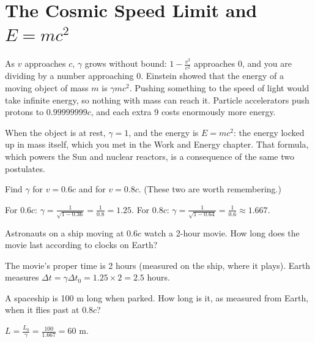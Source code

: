 \section{The Cosmic Speed Limit and $E = mc^2$}
As $v$ approaches $c$, $\gamma$ grows without bound: $1 - \frac{v^2}{c^2}$ approaches 0, and you are
dividing by a number approaching 0. Einstein showed that the energy of a moving object of mass $m$
is $\gamma mc^2$. Pushing something to the speed of light would take infinite energy, so nothing
with mass can reach it. Particle accelerators push protons to $0.99999999c$, and each extra 9
costs enormously more energy.

When the object is at rest, $\gamma = 1$, and the energy is $E = mc^2$: the energy locked up in mass
itself, which you met in the Work and Energy chapter. That formula, which powers the Sun and
nuclear reactors, is a consequence of the same two postulates.

\begin{Exercise}[title={Computing $\gamma$}, label=sr_gamma]
Find $\gamma$ for $v = 0.6c$ and for $v = 0.8c$. (These two are worth remembering.)
\end{Exercise}
\begin{Answer}[ref=sr_gamma]
For $0.6c$: $\gamma = \frac{1}{\sqrt{1 - 0.36}} = \frac{1}{0.8} = 1.25$. For $0.8c$:
$\gamma = \frac{1}{\sqrt{1 - 0.64}} = \frac{1}{0.6} \approx 1.667$.
\end{Answer}

\begin{Exercise}[title={Movie Night in Space}, label=sr_movie]
Astronauts on a ship moving at $0.6c$ watch a 2-hour movie. How long does the movie last according
to clocks on Earth?
\end{Exercise}
\begin{Answer}[ref=sr_movie]
The movie's proper time is 2 hours (measured on the ship, where it plays). Earth measures
$\Delta t = \gamma\Delta t_0 = 1.25 \times 2 = 2.5$ hours.
\end{Answer}

\begin{Exercise}[title={A Shrinking Spaceship}, label=sr_length]
A spaceship is 100 m long when parked. How long is it, as measured from Earth, when it flies past at
$0.8c$?
\end{Exercise}
\begin{Answer}[ref=sr_length]
$L = \frac{L_0}{\gamma} = \frac{100}{1.667} = 60$ m.
\end{Answer}


